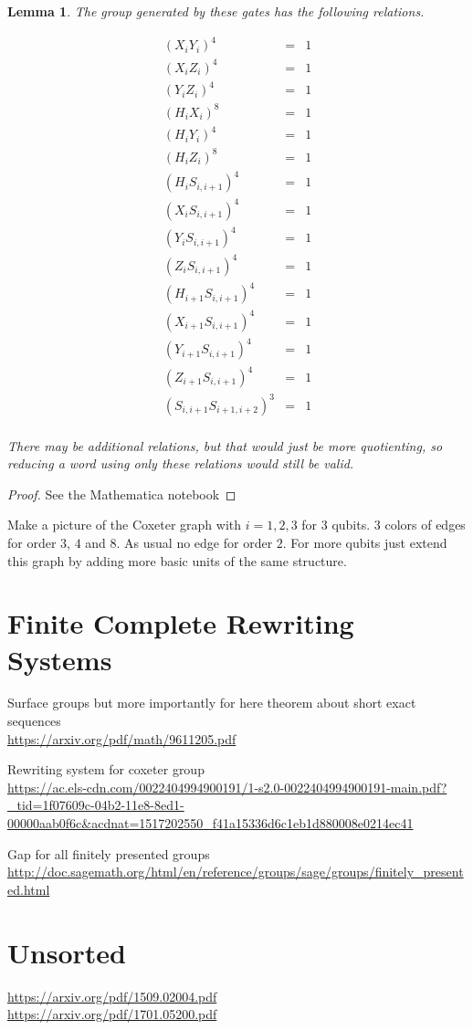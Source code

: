 \documentclass[11pt]{article}
\theoremstyle{change}
\newtheorem{lemma}[equation]{Lemma}
\theoremstyle{nonumberplain}
\newtheorem{proof}{Proof}
\numberwithin{equation}{section}
\begin{document}
\begin{lemma}
The group generated by these gates has the following relations.

\begin{eqnarray*}
( X_i Y_i )^4 &=& 1\\
( X_i Z_i )^4 &=& 1\\
( Y_i Z_i )^4 &=& 1\\
( H_i X_i )^8 &=& 1\\
( H_i Y_i )^4 &=& 1\\
( H_i Z_i )^8 &=& 1\\
(H_i S_{i,i+1})^4 &=& 1\\
(X_i S_{i,i+1})^4 &=& 1\\
(Y_i S_{i,i+1})^4 &=& 1\\
(Z_i S_{i,i+1})^4 &=& 1\\
(H_{i+1} S_{i,i+1})^4 &=& 1\\
(X_{i+1} S_{i,i+1})^4 &=& 1\\
(Y_{i+1} S_{i,i+1})^4 &=& 1\\
(Z_{i+1} S_{i,i+1})^4 &=& 1\\
(S_{i,i+1} S_{i+1,i+2})^3 &=& 1\\
\end{eqnarray*}

There may be additional relations, but that would just be more quotienting, so reducing a word using only these relations would still be valid.
\end{lemma}

\begin{proof}
See the Mathematica notebook
\end{proof}

Make a picture of the Coxeter graph with $i=1,2,3$ for 3 qubits. 3 colors of edges for order $3$, $4$ and $8$. As usual no edge for order $2$. For more qubits just extend this graph by adding more basic units of the same structure.

\section{Finite Complete Rewriting Systems}

Surface groups but more importantly for here theorem about short exact sequences\\
\url{https://arxiv.org/pdf/math/9611205.pdf}

Rewriting system for coxeter group\\
\url{https://ac.els-cdn.com/0022404994900191/1-s2.0-0022404994900191-main.pdf?_tid=1f07609c-04b2-11e8-8ed1-00000aab0f6c&acdnat=1517202550_f41a15336d6c1eb1d880008e0214ec41}

Gap for all finitely presented groups\\
\url{http://doc.sagemath.org/html/en/reference/groups/sage/groups/finitely_presented.html}

\section{Unsorted}

\url{https://arxiv.org/pdf/1509.02004.pdf}\\
\url{https://arxiv.org/pdf/1701.05200.pdf}
\end{document}
